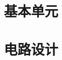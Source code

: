 \documentclass{xNoteBook}
\begin{document}
\tableofcontents
\listoffigures
\listoftables

\mainmatter

\nocite{*}

\part{基本单元}





\part{电路设计}





\appendix

\backmatter



\end{document}
